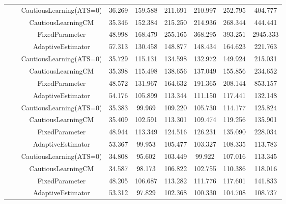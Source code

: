 \begin{table}[!h]
\begin{tabular}[t]{ccccccccc}
 &  & CautiousLearning(ATS=0) & 36.269 & 159.588 & 211.691 & 210.997 & 252.795 & 404.777\\

 &  & CautiousLearningCM & 35.346 & 152.384 & 215.250 & 214.936 & 268.344 & 444.441\\

 & \multirow[t]{-4}{*}{\centering\arraybackslash 0.35} & FixedParameter & 48.998 & 168.479 & 255.165 & 368.295 & 393.251 & 2945.333\\
\cmidrule{2-9}
 &  & AdaptiveEstimator & 57.313 & 130.458 & 148.877 & 148.434 & 164.623 & 221.763\\

 &  & CautiousLearning(ATS=0) & 35.729 & 115.131 & 134.598 & 132.972 & 149.924 & 215.031\\

 &  & CautiousLearningCM & 35.398 & 115.498 & 138.656 & 137.049 & 155.856 & 234.652\\

 & \multirow[t]{-4}{*}{\centering\arraybackslash 0.50} & FixedParameter & 48.572 & 131.967 & 164.632 & 191.365 & 208.144 & 853.157\\
\cmidrule{2-9}
 &  & AdaptiveEstimator & 54.176 & 105.899 & 113.344 & 111.150 & 117.441 & 132.148\\

 &  & CautiousLearning(ATS=0) & 35.383 & 99.969 & 109.220 & 105.730 & 114.177 & 125.824\\

 &  & CautiousLearningCM & 35.409 & 102.591 & 113.301 & 109.474 & 119.256 & 135.901\\

 & \multirow[t]{-4}{*}{\centering\arraybackslash 0.75} & FixedParameter & 48.944 & 113.349 & 124.516 & 126.231 & 135.090 & 228.034\\
\cmidrule{2-9}
 &  & AdaptiveEstimator & 53.367 & 99.953 & 105.477 & 103.327 & 108.335 & 113.783\\

 &  & CautiousLearning(ATS=0) & 34.808 & 95.602 & 103.449 & 99.922 & 107.016 & 113.345\\

 &  & CautiousLearningCM & 34.587 & 98.173 & 106.822 & 102.755 & 110.386 & 118.016\\

 & \multirow[t]{-4}{*}{\centering\arraybackslash 1.00} & FixedParameter & 48.205 & 106.687 & 113.282 & 111.776 & 117.601 & 141.833\\
\cmidrule{2-9}
 &  & AdaptiveEstimator & 53.312 & 97.829 & 102.368 & 100.330 & 104.708 & 108.737\\


\end{tabular}
\end{table}
